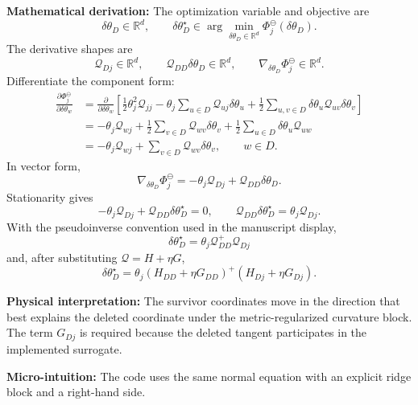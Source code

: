 \documentclass[10pt,twocolumn]{article}
\newcommand{\blocktitle}[1]{\vspace{2pt}\noindent\textbf{#1}\space}
\newcommand{\micro}[1]{\blocktitle{Micro-intuition:} #1}
\newcommand{\deriv}{\blocktitle{Mathematical derivation:}}
\newcommand{\phys}[1]{\blocktitle{Physical interpretation:} #1}
\begin{document}
\deriv
The optimization variable and objective are
\[
\delta\theta_D\in\mathbb R^d,
\qquad
\delta\theta_D^\star
\in
\arg\min_{\delta\theta_D\in\mathbb R^d}
\Phi_j^\ominus(\delta\theta_D).
\]
The derivative shapes are
\[
\mathcal Q_{Dj}\in\mathbb R^d,
\qquad
\mathcal Q_{DD}\delta\theta_D\in\mathbb R^d,
\qquad
\nabla_{\delta\theta_D}\Phi_j^\ominus\in\mathbb R^d.
\]
Differentiate the component form:
{\small
\[
\begin{aligned}
\frac{\partial \Phi_j^\ominus}{\partial \delta\theta_w}
&=
\frac{\partial}{\partial\delta\theta_w}
\left[
\frac12\theta_j^2\mathcal Q_{jj}
-\theta_j\sum_{u\in D}\mathcal Q_{uj}\delta\theta_u
+\frac12\sum_{u,v\in D}
\delta\theta_u\mathcal Q_{uv}\delta\theta_v
\right]
\\
&=
-\theta_j\mathcal Q_{wj}
+\frac12\sum_{v\in D}\mathcal Q_{wv}\delta\theta_v
+\frac12\sum_{u\in D}\delta\theta_u\mathcal Q_{uw}
\\
&=
-\theta_j\mathcal Q_{wj}
+\sum_{v\in D}\mathcal Q_{wv}\delta\theta_v,
\qquad w\in D.
\end{aligned}
\]
}
In vector form,
\[
\nabla_{\delta\theta_D}\Phi_j^\ominus
=
-\theta_j\mathcal Q_{Dj}
+\mathcal Q_{DD}\delta\theta_D.
\]
Stationarity gives
\[
-\theta_j\mathcal Q_{Dj}+\mathcal Q_{DD}\delta\theta_D^\star=0,
\qquad
\mathcal Q_{DD}\delta\theta_D^\star=\theta_j\mathcal Q_{Dj}.
\]
With the pseudoinverse convention used in the manuscript display,
\[
\boxed{
\delta\theta_D^\star
=
\theta_j\mathcal Q_{DD}^{+}\mathcal Q_{Dj}
}
\]
and, after substituting \(\mathcal Q=H+\eta G\),
\[
\boxed{
\delta\theta_D^\star
=
\theta_j
\left(H_{DD}+\eta G_{DD}\right)^+
\left(H_{Dj}+\eta G_{Dj}\right).
}
\]

\phys{The survivor coordinates move in the direction that best explains the deleted coordinate under the metric-regularized curvature block. The term \(G_{Dj}\) is required because the deleted tangent participates in the implemented surrogate.}

\micro{The code uses the same normal equation with an explicit ridge block and a right-hand side.}
\end{document}
